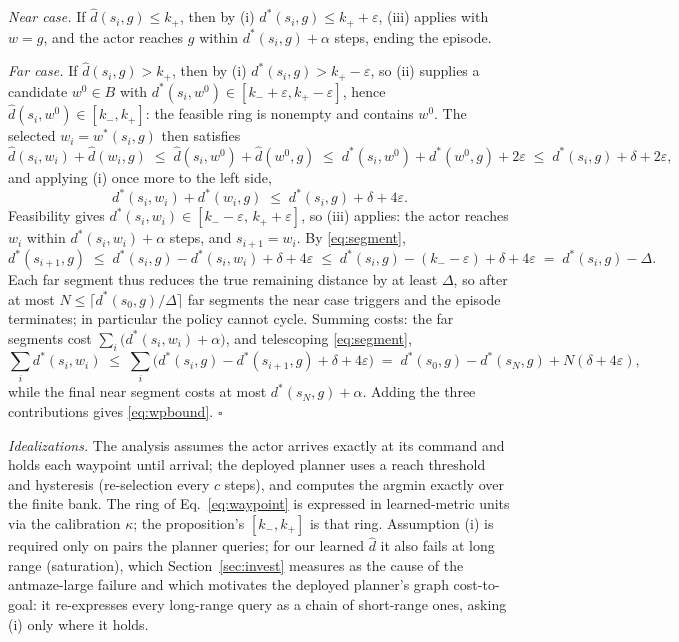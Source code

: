 \documentclass{article}
\theoremstyle{plain}
\theoremstyle{definition}
\begin{document}
\emph{Near case.} If $\hat d(s_i,g)\le k_+$, then by (i) $d^\ast(s_i,g)\le k_++\varepsilon$, (iii) applies with $w=g$, and the actor reaches $g$ within $d^\ast(s_i,g)+\alpha$ steps, ending the episode.

\emph{Far case.} If $\hat d(s_i,g)>k_+$, then by (i) $d^\ast(s_i,g)>k_+-\varepsilon$, so (ii) supplies a candidate $w^0\in B$ with $d^\ast(s_i,w^0)\in[k_-+\varepsilon,k_+-\varepsilon]$, hence $\hat d(s_i,w^0)\in[k_-,k_+]$: the feasible ring is nonempty and contains $w^0$. The selected $w_i=w^\ast(s_i,g)$ then satisfies
\[
\hat d(s_i,w_i)+\hat d(w_i,g)\;\le\;\hat d(s_i,w^0)+\hat d(w^0,g)\;\le\;d^\ast(s_i,w^0)+d^\ast(w^0,g)+2\varepsilon\;\le\;d^\ast(s_i,g)+\delta+2\varepsilon,
\]
and applying (i) once more to the left side,
\begin{equation}
d^\ast(s_i,w_i)+d^\ast(w_i,g)\;\le\;d^\ast(s_i,g)+\delta+4\varepsilon.
\label{eq:segment}
\end{equation}
Feasibility gives $d^\ast(s_i,w_i)\in[k_--\varepsilon,\,k_++\varepsilon]$, so (iii) applies: the actor reaches $w_i$ within $d^\ast(s_i,w_i)+\alpha$ steps, and $s_{i+1}=w_i$. By \eqref{eq:segment},
\[
d^\ast(s_{i+1},g)\;\le\;d^\ast(s_i,g)-d^\ast(s_i,w_i)+\delta+4\varepsilon\;\le\;d^\ast(s_i,g)-(k_--\varepsilon)+\delta+4\varepsilon\;=\;d^\ast(s_i,g)-\Delta .
\]
Each far segment thus reduces the true remaining distance by at least $\Delta$, so after at most $N\le\lceil d^\ast(s_0,g)/\Delta\rceil$ far segments the near case triggers and the episode terminates; in particular the policy cannot cycle. Summing costs: the far segments cost $\sum_i\big(d^\ast(s_i,w_i)+\alpha\big)$, and telescoping \eqref{eq:segment},
\[
\textstyle\sum_i d^\ast(s_i,w_i)\;\le\;\sum_i\big(d^\ast(s_i,g)-d^\ast(s_{i+1},g)+\delta+4\varepsilon\big)\;=\;d^\ast(s_0,g)-d^\ast(s_N,g)+N(\delta+4\varepsilon),
\]
while the final near segment costs at most $d^\ast(s_N,g)+\alpha$. Adding the three contributions gives \eqref{eq:wpbound}. \hfill$\square$

\emph{Idealizations.} The analysis assumes the actor arrives exactly at its command and holds each waypoint until arrival; the deployed planner uses a reach threshold and hysteresis (re-selection every $c$ steps), and computes the argmin exactly over the finite bank. The ring of Eq.~\ref{eq:waypoint} is expressed in learned-metric units via the calibration $\kappa$; the proposition's $[k_-,k_+]$ is that ring. Assumption (i) is required only on pairs the planner queries; for our learned $\hat d$ it also fails at long range (saturation), which Section~\ref{sec:invest} measures as the cause of the antmaze-large failure and which motivates the deployed planner's graph cost-to-goal: it re-expresses every long-range query as a chain of short-range ones, asking (i) only where it holds.
\end{document}

